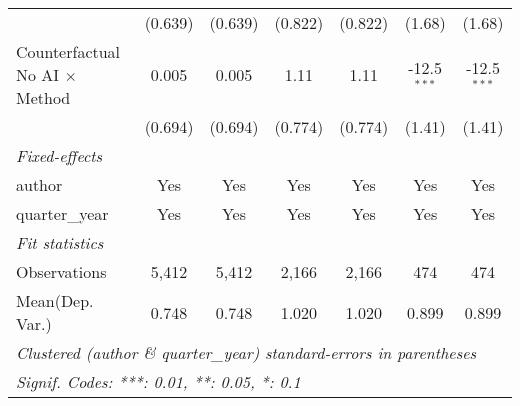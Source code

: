 \begin{tabular}{lcccccc}
                                         & (0.639)       & (0.639)       & (0.822)       & (0.822)       & (1.68)        & (1.68)\\   
   Counterfactual No AI $\times$ Method  & 0.005         & 0.005         & 1.11          & 1.11          & -12.5$^{***}$ & -12.5$^{***}$\\   
                                         & (0.694)       & (0.694)       & (0.774)       & (0.774)       & (1.41)        & (1.41)\\   
   \midrule
   \emph{Fixed-effects}\\
   author                                & Yes           & Yes           & Yes           & Yes           & Yes           & Yes\\  
   quarter\_year                         & Yes           & Yes           & Yes           & Yes           & Yes           & Yes\\  
   \midrule
   \emph{Fit statistics}\\
   Observations                          & 5,412         & 5,412         & 2,166         & 2,166         & 474           & 474\\  
Mean(Dep. Var.) & 0.748 & 0.748 & 1.020 & 1.020 & 0.899 & 0.899 \\
   \midrule \midrule
   \multicolumn{7}{l}{\emph{Clustered (author \& quarter\_year) standard-errors in parentheses}}\\
   \multicolumn{7}{l}{\emph{Signif. Codes: ***: 0.01, **: 0.05, *: 0.1}}\\
\end{tabular}
\par\endgroup
